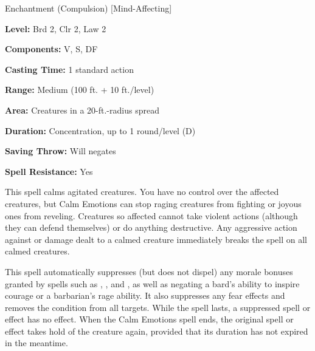 
Enchantment (Compulsion) [Mind-Affecting]

\textbf{Level:} Brd 2, Clr 2, Law 2

\textbf{Components:} V, S, DF

\textbf{Casting Time:} 1 standard action

\textbf{Range:} Medium (100 ft. + 10 ft./level)

\textbf{Area:} Creatures in a 20-ft.-radius spread

\textbf{Duration:} Concentration, up to 1 round/level (D)

\textbf{Saving Throw:} Will negates

\textbf{Spell Resistance:} Yes

This spell calms agitated creatures. You have no control over the affected creatures, 
but Calm Emotions can stop raging creatures from fighting or joyous ones 
from reveling. Creatures so affected cannot take violent actions (although they 
can defend themselves) or do anything destructive. Any aggressive action against 
or damage dealt to a calmed creature immediately breaks the spell on all calmed 
creatures.

This spell automatically suppresses (but does not dispel) any morale bonuses granted 
by spells such as , , and , as well as negating 
a bard's ability to inspire courage or a barbarian's rage ability. It also suppresses 
any fear effects and removes the  condition from all targets. 
While the spell lasts, a suppressed spell or effect has no effect. When the Calm 
Emotions spell ends, the original spell or effect takes hold of the creature again, 
provided that its duration has not expired in the meantime.

